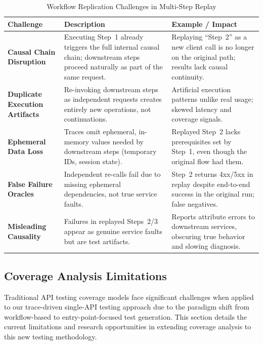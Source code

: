 \documentclass[conference]{IEEEtran}
\begin{document}
\begin{table}[t]
\centering
\caption{Workflow Replication Challenges in Multi-Step Replay}
\label{tab:workflow-challenges}
\renewcommand{\arraystretch}{1.2}
\setlength{\tabcolsep}{6pt}
\begin{tabularx}{\textwidth}{>{\bfseries}p{} X p{}}
\toprule
Challenge & Description & Example / Impact \\
\midrule
Causal Chain Disruption & Executing Step~1 already triggers the full internal causal chain; downstream steps proceed naturally as part of the same request. & Replaying “Step~2” as a new client call is no longer on the original path; results lack causal continuity. \\
Duplicate Execution Artifacts & Re-invoking downstream steps as independent requests creates entirely new operations, not continuations. & Artificial execution patterns unlike real usage; skewed latency and coverage signals. \\
Ephemeral Data Loss & Traces omit ephemeral, in-memory values needed by downstream steps (temporary IDs, session state). & Replayed Step~2 lacks prerequisites set by Step~1, even though the original flow had them. \\
False Failure Oracles & Independent re-calls fail due to missing ephemeral dependencies, not true service faults. & Step~2 returns 4xx/5xx in replay despite end-to-end success in the original run; false negatives. \\
Misleading Causality & Failures in replayed Steps~2/3 appear as genuine service faults but are test artifacts. & Reports attribute errors to downstream services, obscuring true behavior and slowing diagnosis. \\
\bottomrule
\end{tabularx}
\end{table}

\subsection{Coverage Analysis Limitations}\label{sec:coverage-limitations}

Traditional API testing coverage models face significant challenges when applied to our trace-driven single-API testing approach due to the paradigm shift from workflow-based to entry-point-focused test generation. This section details the current limitations and research opportunities in extending coverage analysis to this new testing methodology.
\end{document}

